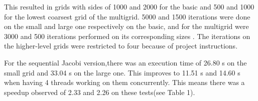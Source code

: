 \documentclass{article}
\begin{document}
\begin{table}
\centering
{}
\caption{Sequential Jacobi test results}
    \label{fig:jacobi}
\end{table}

This resulted in grids with sides of 1000 and 2000 for the basic and 500 and 1000 for the lowest coarsest grid of the multigrid. 5000 and 1500 iterations were done on the small and large one respectively on the basic, and for the multigrid were 3000 and 500 iterations performed on its corresponding sizes . The iterations on the higher-level grids were restricted to four because of project instructions.


For the sequential Jacobi version,there was an execution time of 26.80 s on the small grid and 33.04 s on the large one. This improves to 11.51 s and 14.60 s when having 4 threads working on them concurrently. This means there was a speedup observed of 2.33 and 2.26 on these tests(see Table 1).
\end{document}
